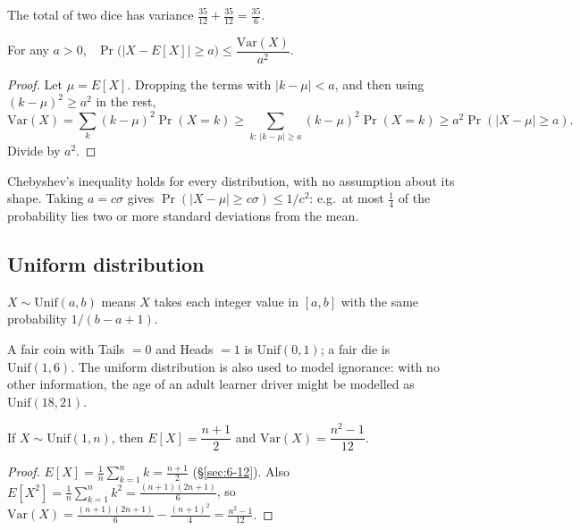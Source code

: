 \begin{example}
The total of two dice has variance $\frac{35}{12}+\frac{35}{12}=\frac{35}6$.
\end{example}

\bigskip
\begin{theorem}
For any $a>0$, \ $\Pr\big(|X-E[X]|\ge a\big) \le \dfrac{\mathrm{Var}(X)}{a^2}$.
\end{theorem}
\begin{proof}
Let $\mu=E[X]$. Dropping the terms with $|k-\mu|<a$, and then using $(k-\mu)^2\ge a^2$ in the rest,
\[
\mathrm{Var}(X) = \sum_k (k-\mu)^2\Pr(X=k) \ge \sum_{k:\,|k-\mu|\ge a} (k-\mu)^2\Pr(X=k) \ge a^2\Pr(|X-\mu|\ge a).
\]
Divide by $a^2$.
\end{proof}

\begin{note}
Chebyshev's inequality holds for every distribution, with no assumption about its shape. Taking $a=c\sigma$ gives $\Pr(|X-\mu|\ge c\sigma)\le1/c^2$: e.g.\ at most $\frac14$ of the probability lies two or more standard deviations from the mean.
\end{note}

\subsection{Uniform distribution}
\label{sec:10-7}

\begin{definition}
$X\sim\mathrm{Unif}(a,b)$ means $X$ takes each integer value in $[a,b]$ with the same probability $1/(b-a+1)$.
\end{definition}

\begin{example}
A fair coin with Tails $=0$ and Heads $=1$ is $\mathrm{Unif}(0,1)$; a fair die is $\mathrm{Unif}(1,6)$. The uniform distribution is also used to model ignorance: with no other information, the age of an adult learner driver might be modelled as $\mathrm{Unif}(18,21)$.
\end{example}

\begin{proposition}
If $X\sim\mathrm{Unif}(1,n)$, then $E[X] = \dfrac{n+1}{2}$ and $\mathrm{Var}(X) = \dfrac{n^2-1}{12}$.
\end{proposition}
\begin{proof}
$E[X]=\frac1n\sum_{k=1}^n k = \frac{n+1}2$ (\S\ref{sec:6-12}). Also $E[X^2]=\frac1n\sum_{k=1}^n k^2=\frac{(n+1)(2n+1)}6$, so $\mathrm{Var}(X)=\frac{(n+1)(2n+1)}6-\frac{(n+1)^2}4=\frac{n^2-1}{12}$.
\end{proof}

